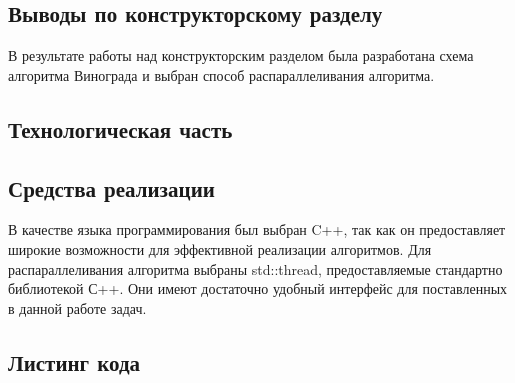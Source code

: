\documentclass[a4paper,12pt]{article}
\begin{document}
    \begin{center}
    	\subsection{Выводы по конструкторскому разделу}    
    \end{center}
   
    	\quad В результате работы над конструкторским разделом была разработана схема алгоритма Винограда и выбран способ распараллеливания алгоритма.
    	
    \newpage
    
    \begin{center}
     	\section{Технологическая часть}
        \subsection{Средства реализации}    
    \end{center}
    
		В качестве языка программирования был выбран C++, так как он предоставляет широкие возможности для эффективной реализации алгоритмов. Для распараллеливания алгоритма выбраны std::thread, предоставляемые стандартно библиотекой С++. Они имеют достаточно удобный интерфейс для поставленных в данной работе задач.
	\begin{center}
	\end{center}

    \begin{center}
        \subsection{Листинг кода}    
    \end{center}
        	
\end{document}
